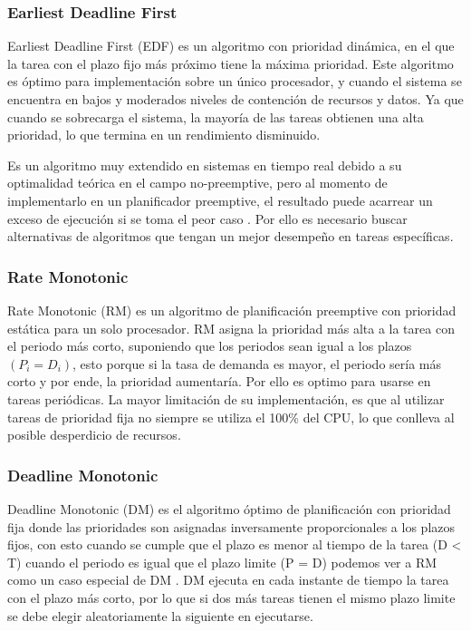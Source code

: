     \subsubsection{Earliest Deadline First} 
    Earliest Deadline First (EDF) es un algoritmo con prioridad dinámica, en el que la tarea con el plazo fijo más próximo tiene la máxima prioridad. Este algoritmo es óptimo para implementación sobre un único procesador, y cuando el sistema se encuentra en bajos y moderados niveles de contención de recursos y datos\cite{Liu}. Ya que cuando se sobrecarga el sistema, la mayoría de las tareas obtienen una alta prioridad, lo que termina en un rendimiento disminuido.
    
     \vspace{0.3cm}
     
    Es un algoritmo muy extendido en sistemas en tiempo real debido a su optimalidad teórica en el campo no-preemptive, pero al momento de implementarlo en un planificador preemptive, el resultado puede acarrear un exceso de ejecución si se toma el peor caso \cite{EmbSysDes}. Por ello es necesario buscar alternativas de algoritmos que tengan un mejor desempeño en tareas específicas.
    
     \subsubsection{Rate Monotonic}
    Rate Monotonic (RM) es un algoritmo de planificación preemptive con prioridad estática para un solo procesador\cite{Liu}. RM asigna la prioridad más alta a la tarea con el periodo más corto, suponiendo que los periodos sean igual a los plazos \( (P_{i} = D_{i}) \), esto porque si la tasa de demanda es mayor, el periodo sería más corto y por ende, la prioridad aumentaría. Por ello es optimo para usarse en tareas periódicas. La mayor limitación de su implementación, es que al utilizar tareas de prioridad fija no siempre se utiliza el 100\%  del CPU, lo que conlleva al posible desperdicio de recursos\cite{RM}.

\subsubsection{Deadline Monotonic}
Deadline Monotonic (DM) es el algoritmo óptimo de planificación con prioridad fija donde las prioridades son asignadas inversamente proporcionales a los plazos fijos, con esto cuando se cumple que el plazo es menor al tiempo de la tarea (D < T) cuando el periodo es igual que el plazo limite (P = D) podemos ver a RM como un caso especial de DM \cite{NPr}. DM ejecuta en cada instante de tiempo la tarea con el plazo más corto, por lo que si dos más tareas tienen el mismo plazo limite se debe elegir aleatoriamente la siguiente en ejecutarse.

